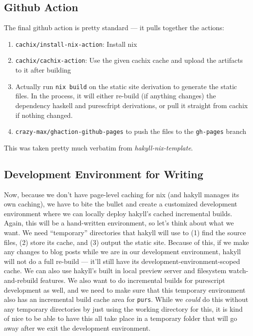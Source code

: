 \documentclass[]{article}
\begin{document}
\subsection{Github Action}\label{github-action}

The final github action is pretty standard --- it pulls together the actions:

\begin{enumerate}
\def\labelenumi{\arabic{enumi}.}
\tightlist
\item
  \texttt{cachix/install-nix-action}: Install nix
\item
  \texttt{cachix/cachix-action}: Use the given cachix cache and upload the
  artifacts to it after building
\item
  Actually run \texttt{nix\ build} on the static site derivation to generate the
  static files. In the process, it will either re-build (if anything changes)
  the dependency haskell and purescfript derivations, or pull it straight from
  cachix if nothing changed.
\item
  \texttt{crazy-max/ghaction-github-pages} to push the files to the
  \texttt{gh-pages} branch
\end{enumerate}

This was taken pretty much verbatim from \emph{hakyll-nix-template}.

\subsection{Development Environment for
Writing}\label{development-environment-for-writing}

Now, because we don't have page-level caching for nix (and hakyll manages its
own caching), we have to bite the bullet and create a customized development
environment where we can locally deploy hakyll's cached incremental builds.
Again, this will be a hand-written environment, so let's think about what we
want. We need ``temporary'' directories that hakyll will use to (1) find the
source files, (2) store its cache, and (3) output the static site. Because of
this, if we make any changes to blog posts while we are in our development
environment, hakyll will not do a full re-build --- it'll still have its
development-environment-scoped cache. We can also use hakyll's built in local
preview server and filesystem watch-and-rebuild features. We also want to do
incremental builds for purescript development as well, and we need to make sure
that this temporary environment also has an incremental build cache area for
\texttt{purs}. While we \emph{could} do this without any temporary directories
by just using the working directory for this, it is kind of nice to be able to
have this all take place in a temporary folder that will go away after we exit
the development environment.
\end{document}

